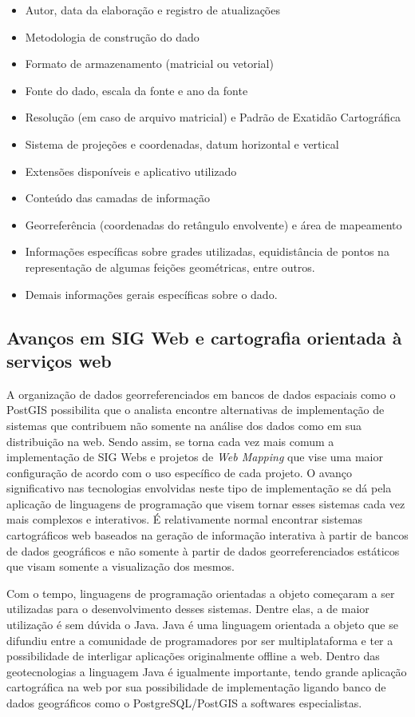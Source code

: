 		\begin{itemize}
			\item Autor, data da elaboração e registro de atualizações
			\item Metodologia de construção do dado
			\item Formato de armazenamento (matricial ou vetorial)
			\item Fonte do dado, escala da fonte e ano da fonte
			\item Resolução (em caso de arquivo matricial) e Padrão de Exatidão Cartográfica
			\item Sistema de projeções e coordenadas, datum horizontal e vertical
			\item Extensões disponíveis e aplicativo utilizado
			\item Conteúdo das camadas de informação
			\item Georreferência (coordenadas do retângulo envolvente) e área de mapeamento
			\item Informações específicas sobre grades utilizadas, equidistância de pontos na representação de algumas feições geométricas, entre outros.
			\item Demais informações gerais específicas sobre o dado.
		\end{itemize}
		
		\subsection{Avanços em SIG Web e cartografia orientada à serviços web}
		
		A organização de dados georreferenciados em bancos de dados espaciais como o PostGIS possibilita que o analista encontre alternativas de implementação de sistemas que contribuem não somente na análise dos dados como em sua distribuição na web. Sendo assim, se torna cada vez mais comum a implementação de SIG Webs e projetos de\textit{ Web Mapping} que vise uma maior configuração de acordo com o uso específico de cada projeto. O avanço significativo nas tecnologias envolvidas neste tipo de implementação se dá pela aplicação de linguagens de programação que visem tornar esses sistemas cada vez mais complexos e interativos. É relativamente normal encontrar sistemas cartográficos web baseados na geração de informação interativa à partir de bancos de dados geográficos e não somente à partir de dados georreferenciados estáticos que visam somente a visualização dos mesmos.
		
		Com o tempo, linguagens de programação orientadas a objeto começaram a ser utilizadas para o desenvolvimento desses sistemas. Dentre elas, a de maior utilização é sem dúvida o Java. Java é uma linguagem orientada a objeto que se difundiu entre a comunidade de programadores por ser multiplataforma e ter a possibilidade de interligar aplicações originalmente offline a web. Dentro das geotecnologias a linguagem Java é igualmente importante, tendo grande aplicação cartográfica na web por sua possibilidade de implementação ligando banco de dados geográficos como o PostgreSQL/PostGIS a softwares especialistas.
		
